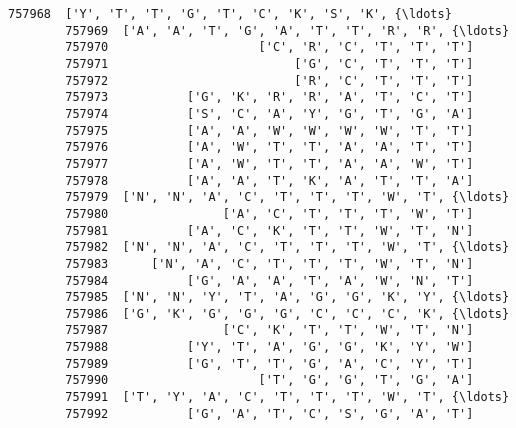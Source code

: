 \documentclass[11pt]{article}
\begin{document}
\begin{Verbatim}[commandchars=\\\{\}]
        757968  ['Y', 'T', 'T', 'G', 'T', 'C', 'K', 'S', 'K', {\ldots}   
        757969  ['A', 'A', 'T', 'G', 'A', 'T', 'T', 'R', 'R', {\ldots}   
        757970                     ['C', 'R', 'C', 'T', 'T', 'T']   
        757971                          ['G', 'C', 'T', 'T', 'T']   
        757972                          ['R', 'C', 'T', 'T', 'T']   
        757973           ['G', 'K', 'R', 'R', 'A', 'T', 'C', 'T']   
        757974           ['S', 'C', 'A', 'Y', 'G', 'T', 'G', 'A']   
        757975           ['A', 'A', 'W', 'W', 'W', 'W', 'T', 'T']   
        757976           ['A', 'W', 'T', 'T', 'A', 'A', 'T', 'T']   
        757977           ['A', 'W', 'T', 'T', 'A', 'A', 'W', 'T']   
        757978           ['A', 'A', 'T', 'K', 'A', 'T', 'T', 'A']   
        757979  ['N', 'N', 'A', 'C', 'T', 'T', 'T', 'W', 'T', {\ldots}   
        757980                ['A', 'C', 'T', 'T', 'T', 'W', 'T']   
        757981           ['A', 'C', 'K', 'T', 'T', 'W', 'T', 'N']   
        757982  ['N', 'N', 'A', 'C', 'T', 'T', 'T', 'W', 'T', {\ldots}   
        757983      ['N', 'A', 'C', 'T', 'T', 'T', 'W', 'T', 'N']   
        757984           ['G', 'A', 'A', 'T', 'A', 'W', 'N', 'T']   
        757985  ['N', 'N', 'Y', 'T', 'A', 'G', 'G', 'K', 'Y', {\ldots}   
        757986  ['G', 'K', 'G', 'G', 'G', 'C', 'C', 'C', 'K', {\ldots}   
        757987                ['C', 'K', 'T', 'T', 'W', 'T', 'N']   
        757988           ['Y', 'T', 'A', 'G', 'G', 'K', 'Y', 'W']   
        757989           ['G', 'T', 'T', 'G', 'A', 'C', 'Y', 'T']   
        757990                     ['T', 'G', 'G', 'T', 'G', 'A']   
        757991  ['T', 'Y', 'A', 'C', 'T', 'T', 'T', 'W', 'T', {\ldots}   
        757992           ['G', 'A', 'T', 'C', 'S', 'G', 'A', 'T']   
        

\end{Verbatim}
\end{document}
